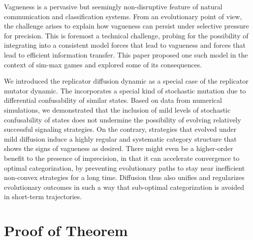 \documentclass[fleqn,reqno,10pt]{article}
\newcommand{\rdd}{\acro{rdd}} %
\begin{document}
Vagueness is a pervasive but seemingly non-disruptive feature of
natural communication and classification systems. From an evolutionary
point of view, the challenge arises to explain how vagueness can
persist under selective pressure for precision. This is foremost a
technical challenge, probing for the possibility of integrating into a
consistent model forces that lead to vagueness and forces that lead
to efficient information transfer. This paper proposed one such model
in the context of sim-max games and explored some of its consequences.

We introduced the replicator diffusion dynamic as a special case of
the replicator mutator dynamic. The \rdd incorporates a special kind
of stochastic mutation due to differential confusability of similar
states. Based on data from numerical simulations, we demonstrated that
the inclusion of mild levels of stochastic confusability of states
does not undermine the possibility of evolving relatively successful
signaling strategies. On the contrary, strategies that evolved under
mild diffusion induce a highly regular and systematic category
structure that shows the signs of vagueness as desired. There might
even be a higher-order benefit to the presence of imprecision, in that
it can accelerate convergence to optimal categorization, by preventing
evolutionary paths to stay near inefficient non-convex strategies for
a long time. Diffusion thus also unifies and regularizes evolutionary
outcomes in such a way that sub-optimal categorization is avoided in
short-term trajectories.



\appendix

\section{Proof of Theorem}
\label{sec:proofs}
\end{document}
